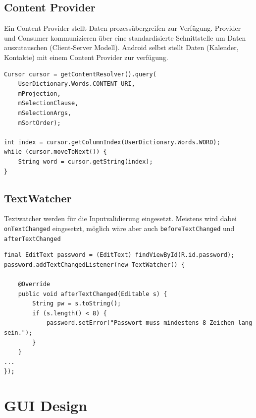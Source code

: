 \subsection{Content Provider}
Ein Content Provider stellt Daten prozessübergreifen zur Verfügung. Provider und Consumer kommunizieren über eine standardisierte Schnittstelle um Daten auszutauschen (Client-Server Modell). Android selbst stellt Daten (Kalender, Kontakte) mit einem Content Provider zur verfügung.
\begin{lstlisting}[caption=Content Provider Client]
Cursor cursor = getContentResolver().query(
	UserDictionary.Words.CONTENT_URI,
	mProjection,
	mSelectionClause,
	mSelectionArgs,
	mSortOrder);
	
int index = cursor.getColumnIndex(UserDictionary.Words.WORD);
while (cursor.moveToNext()) {
	String word = cursor.getString(index);
}
\end{lstlisting}

\subsection{TextWatcher}
Textwatcher werden für die Inputvalidierung eingesetzt. Meistens wird dabei \lstinline|onTextChanged| eingesetzt, möglich wäre aber auch \lstinline|beforeTextChanged| und \lstinline|afterTextChanged|
\begin{lstlisting}[caption=TextWatcher]
final EditText password = (EditText) findViewById(R.id.password);
password.addTextChangedListener(new TextWatcher() {

	@Override
	public void afterTextChanged(Editable s) {
		String pw = s.toString();
		if (s.length() < 8) {
			password.setError("Passwort muss mindestens 8 Zeichen lang sein.");
		}
	}
...
});
\end{lstlisting}


\section{GUI Design}
